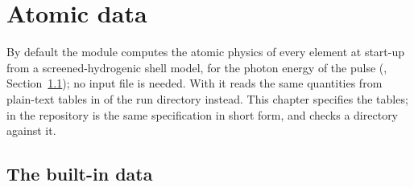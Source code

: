 \chapter{Atomic data}
\label{ch:data}

By default the module computes the atomic physics of every element at start-up from a screened-hydrogenic shell
model, for the photon energy of the pulse (, Section~\ref{sec:builtin}); no input
file is needed.
With  it reads the same quantities from plain-text tables in  of
the run directory instead.
This chapter specifies the tables;  in the repository is the same specification in short form,
and  checks a directory against it.

\section{The built-in data}
\label{sec:builtin}

